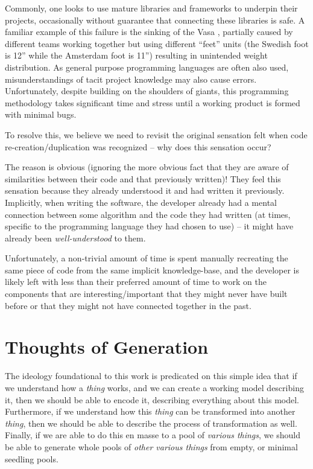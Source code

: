 Commonly, one looks to use mature libraries and frameworks to underpin their
projects, occasionally without guarantee that connecting these libraries is
safe. A familiar example of this failure is the sinking of the Vasa
\cite{wiki:Vasa_ship}, partially caused by different teams working together but
using different ``feet'' units (the Swedish foot is 12'' while the Amsterdam
foot is 11'') resulting in unintended weight distribution. As general purpose
programming languages are often also used, misunderstandings of tacit project
knowledge may also cause errors. Unfortunately, despite building on the
shoulders of giants, this programming methodology takes significant time and
stress until a working product is formed with minimal bugs.

To resolve this, we believe we need to revisit the original sensation felt when
code re-creation/duplication was recognized -- why does this sensation occur?

The reason is obvious (ignoring the more obvious fact that they are aware of
similarities between their code and that previously written)! They feel this
sensation because they already understood it and had written it previously.
Implicitly, when writing the software, the developer already had a mental
connection between some algorithm and the code they had written (at times,
specific to the programming language they had chosen to use) -- it might have
already been \textit{well-understood} to them.

Unfortunately, a non-trivial amount of time is spent manually recreating the
same piece of code from the same implicit knowledge-base, and the developer is
likely left with less than their preferred amount of time to work on the
components that are interesting/important that they might never have built
before or that they might not have connected together in the past.

\section{Thoughts of Generation}
\label{sec:idlgy:thoughts_of_generation}

The ideology foundational to this work is predicated on this simple idea that if
we understand how a \textit{thing} works, and we can create a working model
describing it, then we should be able to encode it, describing everything about
this model. Furthermore, if we understand how this \textit{thing} can be
transformed into another \textit{thing}, then we should be able to describe the
process of transformation as well. Finally, if we are able to do this en masse
to a pool of \textit{various things}, we should be able to generate whole pools
of \textit{other various things} from empty, or minimal seedling pools.

